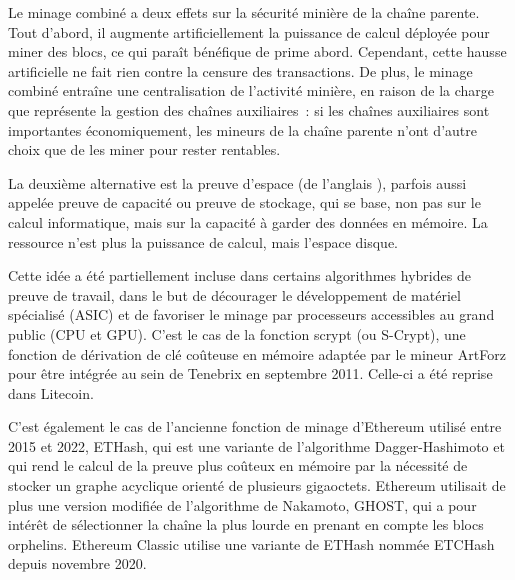 Le minage combiné a deux effets sur la sécurité minière de la chaîne parente. Tout d'abord, il augmente artificiellement la puissance de calcul déployée pour miner des blocs, ce qui paraît bénéfique de prime abord. Cependant, cette hausse artificielle ne fait rien contre la censure des transactions. De plus, le minage combiné entraîne une centralisation de l'activité minière, en raison de la charge que représente la gestion des chaînes auxiliaires~: si les chaînes auxiliaires sont importantes économiquement, les mineurs de la chaîne parente n'ont d'autre choix que de les miner pour rester rentables.



La deuxième alternative est la preuve d'espace (de l'anglais ), parfois aussi appelée preuve de capacité ou preuve de stockage, qui se base, non pas sur le calcul informatique, mais sur la capacité à garder des données en mémoire. La ressource n'est plus la puissance de calcul, mais l'espace disque.

Cette idée a été partiellement incluse dans certains algorithmes hybrides de preuve de travail, dans le but de décourager le développement de matériel spécialisé (ASIC) et de favoriser le minage par processeurs accessibles au grand public (CPU et GPU). C'est le cas de la fonction scrypt (ou S-Crypt), une fonction de dérivation de clé coûteuse en mémoire adaptée par le mineur ArtForz pour être intégrée au sein de Tenebrix en septembre 2011. Celle-ci a été reprise dans Litecoin.

C'est également le cas de l'ancienne fonction de minage d'Ethereum utilisé entre 2015 et 2022, ETHash, qui est une variante de l'algorithme Dagger-Hashimoto et qui rend le calcul de la preuve plus coûteux en mémoire par la nécessité de stocker un graphe acyclique orienté de plusieurs gigaoctets. Ethereum utilisait de plus une version modifiée de l'algorithme de Nakamoto, GHOST, qui a pour intérêt de sélectionner la chaîne la plus lourde en prenant en compte les blocs orphelins. Ethereum Classic utilise une variante de ETHash nommée ETCHash depuis novembre 2020.

